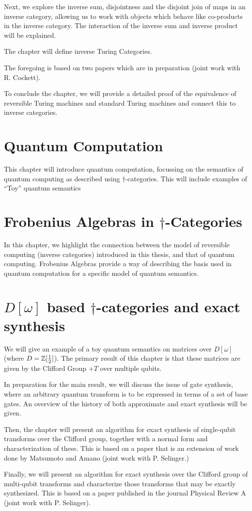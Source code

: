 Next, we explore the inverse sum, disjointness and the disjoint join of maps in an inverse
category, allowing us to work with objects which behave like co-products in the inverse category.
The interaction of the inverse sum and inverse product will be explained.

The chapter will define inverse Turing Categories.

The foregoing is based on two papers which are in preparation (joint work with R. Cockett).

To conclude the chapter, we will provide a detailed proof of the equivalence of reversible Turing
machines and standard Turing machines and connect this to inverse categories.

\section*{Quantum Computation}
This chapter will introduce quantum computation, focussing on
the semantics of quantum computing as described using $\dagger$-categories. This will include
examples of ``Toy'' quantum semantics

\section*{Frobenius Algebras in $\dagger$-Categories}

In this chapter, we highlight the connection between the model of reversible computing (inverse
categories) introduced in this thesis, and that of quantum computing. Frobenius Algebras provide a
way of describing the basis used in quantum computation for a specific model of quantum semantics.


\section*{$D[\omega]$ based $\dagger$-categories and exact synthesis}

We will give an example of a toy quantum semantics on matrices over $D[\omega]$ (where
$D = \mathbb{Z}[\frac{1}{2}]$). The primary result of this chapter is that these matrices are
given by the Clifford Group +$T$ over multiple qubits.

In preparation for the main result, we will discuss the issue of gate synthesis, where an arbitrary
quantum transform is to be expressed in terms of a set of base gates. An overview of the history of
both approximate and exact synthesis will be given.

Then, the chapter will present an algorithm for exact synthesis of single-qubit transforms over the
Clifford group, together with a normal form and characterization of these. This is based on a paper
that is an extension of work done by Matsumoto and Amano (joint work with P. Selinger.)

Finally, we will present an algorithm for exact synthesis over the Clifford group of multi-qubit
transforms and characterize those transforms that may be exactly synthesized. This is based on a
paper published in the journal Physical Review A (joint work with P. Selinger).


